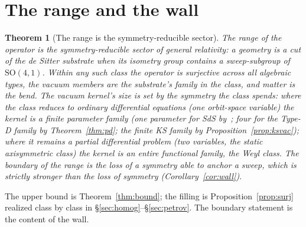 \documentclass[11pt,a4paper]{article}
\newtheorem{theorem}{Theorem}
\theoremstyle{definition}
\newcommand{\so}{\mathrm{SO}(4,1)}
\begin{document}
\section{The range and the wall}\label{sec:wall}

\begin{theorem}[The range is the symmetry-reducible sector]\label{thm:range}
The range of the operator is the symmetry-reducible sector of general relativity: a geometry is a cut of the de Sitter substrate when its isometry group contains a sweep-subgroup of $\so$. Within any such class the operator is surjective across all algebraic types, the vacuum members are the substrate's family in the class, and matter is the bend. The vacuum kernel's size is set by the symmetry the class spends: where the class reduces to ordinary differential equations (one orbit-space variable) the kernel is a finite parameter family (one parameter for SdS by~\cite{JanzenOperator}; four for the Type-D family by Theorem~\ref{thm:pd}; the finite KS family by Proposition~\ref{prop:ksvac}); where it remains a partial differential problem (two variables, the static axisymmetric class) the kernel is an entire functional family, the Weyl class. The boundary of the range is the loss of a symmetry able to \emph{anchor} a sweep, which is strictly stronger than the loss of symmetry (Corollary~\ref{cor:wall}).
\end{theorem}

The upper bound is Theorem~\ref{thm:bound}; the filling is Proposition~\ref{prop:surj} realized class by class in \S\ref{sec:homog}--\S\ref{sec:petrov}. The boundary statement is the content of the wall.
\end{document}
